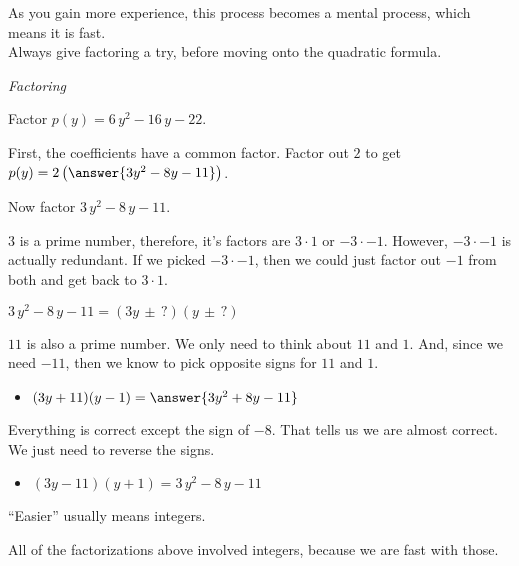 \documentclass{ximera}
\begin{document}
As you gain more experience, this process becomes a mental process, which means it is fast. \\


Always give factoring a try, before moving onto the quadratic formula. \\






\begin{example} \textit{Factoring}

Factor $p(y) = 6 \, y^2 - 16 \, y - 22$.

\begin{explanation}

First, the coefficients have a common factor.  Factor out $2$ to get $p(y) = 2 \left( \answer{3 y^2 - 8 y - 11} \right)$.


Now factor $3 \, y^2 - 8 \, y - 11$.



$3$ is a prime number, therefore, it's factors are $3 \cdot 1$ or $-3 \cdot -1$. However, $-3 \cdot -1$ is actually redundant.  If we picked $-3 \cdot -1$, then we could just factor out $-1$ from both and get back to $3 \cdot 1$.


$3 \, y^2 - 8 \, y - 11 = (3y \, \pm \, ?) (y \, \pm \, ?) $


$11$ is also a prime number. We only need to think about $11$ and $1$. And, since we need $-11$, then we know to pick opposite signs for $11$ and $1$.



\begin{itemize}
\item $(3y + 11) (y - 1) = \answer{3 y^2 + 8 y - 11}$
\end{itemize}

Everything is correct except the sign of $-8$. That tells us we are almost correct. We just need to reverse the signs.


\begin{itemize}
\item $(3y - 11) (y + 1) = 3 \, y^2 - 8 \, y - 11$
\end{itemize}




\end{explanation}
\end{example}


``Easier'' usually means integers.  

All of the factorizations above involved integers, because we are fast with those. \\
\end{document}
